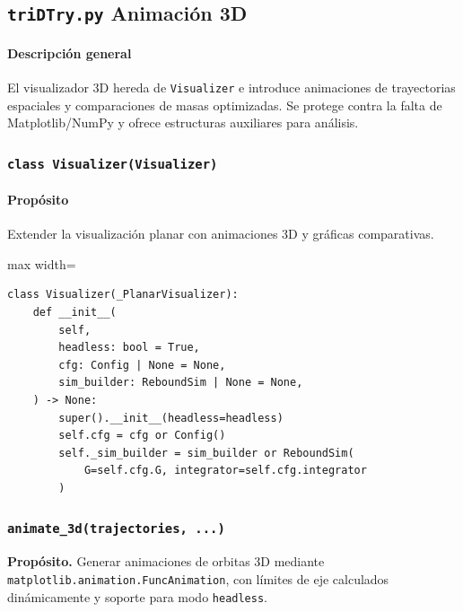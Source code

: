 \subsection{\texttt{triDTry.py} \- Animación 3D}
\paragraph{Descripción general}
El visualizador 3D hereda de \texttt{Visualizer} e introduce animaciones de trayectorias espaciales y comparaciones de masas optimizadas. Se protege contra la falta de Matplotlib/NumPy y ofrece estructuras auxiliares para análisis.

\subsubsection{\texttt{class Visualizer(Visualizer)}}
\paragraph{Propósito} Extender la visualización planar con animaciones 3D y gráficas comparativas.

\begin{listing}[H]
\caption{Inicialización del visualizador 3D}
\begin{adjustbox}{max width=\textwidth}
\begin{minipage}{\textwidth}
\begin{verbatim}
class Visualizer(_PlanarVisualizer):
    def __init__(
        self,
        headless: bool = True,
        cfg: Config | None = None,
        sim_builder: ReboundSim | None = None,
    ) -> None:
        super().__init__(headless=headless)
        self.cfg = cfg or Config()
        self._sim_builder = sim_builder or ReboundSim(
            G=self.cfg.G, integrator=self.cfg.integrator
        )
\end{verbatim}
\end{minipage}
\end{adjustbox}
\end{listing}

\subsubsection*{\texttt{animate\_3d(trajectories, ...)}}
\textbf{Propósito.} Generar animaciones de orbitas 3D mediante \texttt{matplotlib.animation.FuncAnimation}, con límites de eje calculados dinámicamente y soporte para modo \texttt{headless}.

